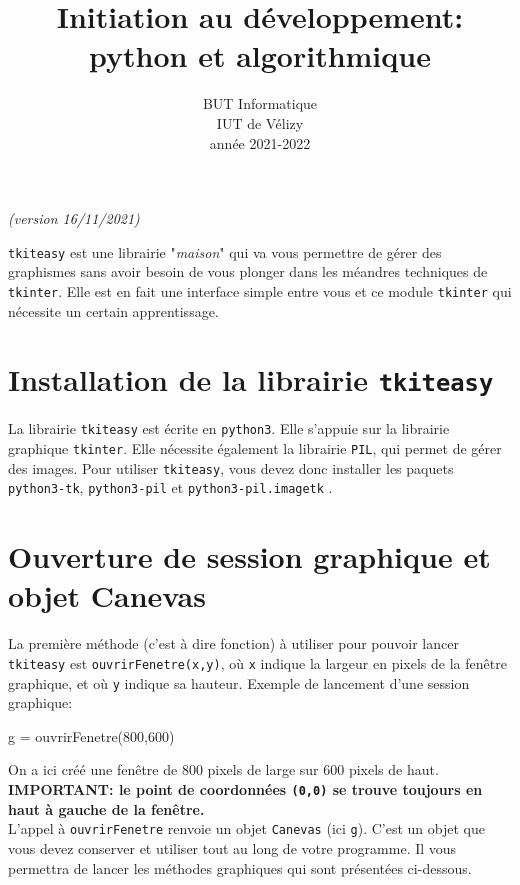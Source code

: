 \documentclass[11pt,a4paper]{article}
\title{Initiation au développement: python et algorithmique}
\author{BUT Informatique\\
IUT de Vélizy\\
année 2021-2022}
\date{}
\begin{document}





\thispagestyle{empty}


\newpage 
\hfill {\it (version 16/11/2021)}
\begin{center}
\end{center}

{\tt tkiteasy} est une librairie "{\it maison}" qui va vous permettre de gérer des graphismes sans avoir besoin de vous plonger dans les méandres techniques de {\tt tkinter}. Elle est en fait une interface simple entre vous et ce module {\tt tkinter} qui nécessite un certain apprentissage.

\section{Installation de la librairie {\tt tkiteasy}}
La librairie {\tt tkiteasy} est écrite en {\tt python3}. Elle s'appuie sur la librairie graphique {\tt tkinter}. Elle nécessite également la librairie {\tt PIL}, qui permet de gérer des images. Pour utiliser {\tt tkiteasy}, vous devez donc installer les paquets {\tt python3-tk}, {\tt python3-pil} et {\tt python3-pil.imagetk} .

\section{Ouverture de session graphique et objet Canevas}
La première méthode (c'est à dire fonction) à utiliser pour pouvoir lancer {\tt tkiteasy} est {\tt ouvrirFenetre(x,y)}, où {\tt x} indique la largeur en pixels de la fenêtre graphique, et où {\tt y} indique sa hauteur. Exemple de lancement d'une session graphique:
\begin{ccode}
    g = ouvrirFenetre(800,600)
\end{ccode}
On a ici créé une fenêtre de 800 pixels de large sur 600 pixels de haut.\\
{\bf IMPORTANT: le point de coordonnées {\tt (0,0)} se trouve toujours en haut à gauche de la fenêtre.}\\

L'appel à {\tt ouvrirFenetre} renvoie un objet {\tt Canevas} (ici {\tt g}). C'est un objet que vous devez conserver et utiliser tout au long de votre programme. Il vous permettra de lancer les méthodes graphiques qui sont présentées ci-dessous.
\end{document}
